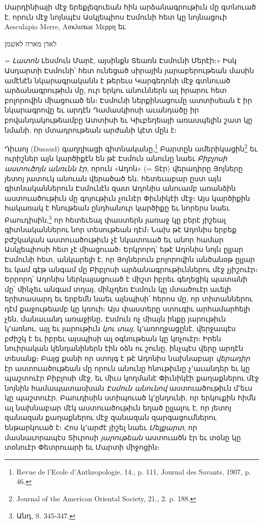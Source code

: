 \documentclass{article}
\begin{document}
{Սարդինիայի մէջ երեքլեզուեան հին արձանագրութիւն մը գտնուած է, որուն մէջ նոյնպէս Ասկլեպիոս Էսմունի հետ կը նոյնացուի Aesculapio Merre, Ασκλυπωε Μερρη եւ \begin{hebrewfont}לאדן מארה לאשׁמן\end{hebrewfont} = \emph{Լատոն} Լեսմուն Մարէ, այսինքն Տեառն Էսմունի Մերէի։» Իսկ Ասդարտի Էսմունի՝ հետ ունեցած սիրային յարաբերութեան մասին ամէնէն նկարագրականն է թերեւս Կարգեդոնի մէջ գտնուած արձանագրութիւն մը, ուր երկու անուններն ալ իրարու հետ բոլորովին միացուած են։ Էսմունի ներքինացումը ատտիսեան է իր նկարագրովը եւ արդէն Դամասկիոսի աւանդածը իր բովանդակութեամբը Ատտիսի եւ Կիւբեղեայի առասպելին շատ կը նմանի, որ մտադրութեան արժանի կէտ մըն է։

Դիւսոյ (Dusaud) գաղղիացի գիտնականը,\footnote{Revue de l'Ecole d'Anthropologie, 14., p. 111, Journal des Savants, 1907, p. 46.} Բարտըն ամերիկացին\footnote{Journal of the American Oriental Society, 21., 2. p. 188.} եւ ուրիշներ այն կարծիքէն են թէ Էսմուն անունը նաեւ \emph{Բիբլոսի աստուծոյն անռւնն էր}, որուն «Ադոն» (= Տէր) վերադիրը Յոյները յետոյ յատուկ անուան վերածած են․ հետեւաբար ըստ այն գիտնականներուն Էսմունէն զատ Ադոնիս անուամբ առանձին աստուածութիւն մը գոյութիւն չունէր Փիւնիկէի մէջ։ Այս կարծիքին հակառակ է հնութեան ընդհանուր կարծիքը եւ նորերս նաեւ Բաուդիսին,\footnote{Անդ, S. 345֊347.} որ հետեւեալ փաստերն յառաջ կը բերէ յիշեալ գիտնականներու նոր տեսութեան դէմ։ Նախ թէ Ադոնիս երբեք բժշկական աստուածութիւն չէ նկատուած եւ անոր համար Ասկլեպիոսի հետ չէ միացուած։ Երկրորդ՝ եթէ Ադոնիս նոյն ըլլար Էսմունի հետ, անկարելի է, որ Յոյներուն բոլորովին անծանօթ ըլլար եւ կամ գէթ անգամ մը Բիբլոսի արձանագրութիւններու մէջ չյիշուէր։ Երրորդ՝ Ադոնիս ներկայացուած է միշտ իբրեւ գեղեցիկ պատանի մը՝ մինչեւ անգամ տղայ, մինչդեռ Էսմուն կը մտածուէր աւելի երիտասարդ եւ երբեմն նաեւ այնպիսի՛ հերոս մը, որ տիտաններու դէմ քաջութեամբ կը կռուի։ Այս փաստերը ստուգիւ արհամարհելի չեն, մանաւանդ առաջինը․ Էսմուն ոչ միայն ինքը յարութիւն կ՚առնու, այլ եւ յարութիւն \emph{կու տայ}, կ՚առողջացընէ, վերջապէս բժիշկ է եւ իբրեւ այսպիսի ալ օգնութեան կը կոչուէր։ Իրեն նուիրական կենդանիներն էին օձն ու շունը, ինչպէս վերը արդէն տեսանք։ Բայց քանի որ ստոյգ է թէ Ադոնիս նախնաբար \emph{վերադիր} էր աստուածութեան մը որուն անունը հնութիւնը չ՚աւանդեր եւ կը պաշտուէր Բիբլոսի մէջ, եւ միւս կողմանէ Փիւնիկէի քաղաքներու մէջ նոյնին համապատասխան \emph{Էսմուն անունով} աստուածութիւն մ՚եւս կը պաշտուէր, Բաուդիսին ստիպուած կ՚ընդունի, որ երկուքին հիմն ալ նախնաբար մէկ աստուածութիւն եղած ըլլալու է, որ յետոյ զանազան քաղաքներու մէջ զանազան զարգացումներու ենթարկուած է։ Հոս կ՚արժէ յիշել նաեւ \emph{Մելքարտ}, որ մասնաւորապէս Տիւրոսի \emph{յարութեան} աստուածն էր եւ տօնը կը տօնուէր Փետրուարի եւ Մարտի միջոցին։

}
\end{document}
